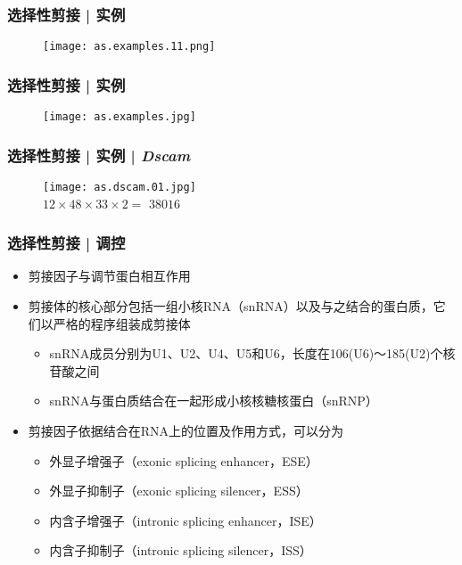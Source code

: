 \begin{frame}
  \frametitle{选择性剪接 | 实例}
  \begin{figure}
    \centering
    \texttt{[image: as.examples.11.png]}
  \end{figure}
\end{frame}

\begin{frame}
  \frametitle{选择性剪接 | 实例}
  \begin{figure}
    \centering
    \texttt{[image: as.examples.jpg]}
  \end{figure}
\end{frame}

\begin{frame}
  \frametitle{选择性剪接 | 实例 | \textit{Dscam}}
  \begin{figure}
    \centering
    \texttt{[image: as.dscam.01.jpg]}
    \\ \Large{$12 \times 48 \times 33 \times 2 = $}
    \pause
    \Large{$38016$}
  \end{figure}
\end{frame}

\begin{frame}
  \frametitle{选择性剪接 | 调控}
  \begin{itemize}
    \item 剪接因子与调节蛋白相互作用
    \item 剪接体的核心部分包括一组小核RNA（snRNA）以及与之结合的蛋白质，它们以严格的程序组装成剪接体
      \begin{itemize}
	\item snRNA成员分别为U1、U2、U4、U5和U6，长度在106(U6)～185(U2)个核苷酸之间
	\item snRNA与蛋白质结合在一起形成小核核糖核蛋白（snRNP）
      \end{itemize}
    \item 剪接因子依据结合在RNA上的位置及作用方式，可以分为
      \begin{itemize}
	\item 外显子增强子（exonic splicing enhancer，ESE）
	\item 外显子抑制子（exonic splicing silencer，ESS）
	\item 内含子增强子（intronic splicing enhancer，ISE）
	\item 内含子抑制子（intronic splicing silencer，ISS）
      \end{itemize}
  \end{itemize}
\end{frame}

